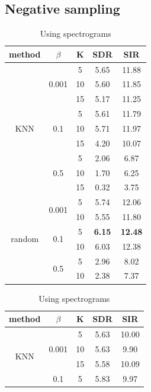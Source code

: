 \documentclass[master, tikz, final,11pt, dvipdfmx]{iscs-thesis}
\begin{document}
\subsection{Negative sampling}
\label{NS}

\begin{table}
\begin{subtable}{.5\linewidth}
\centering
\begin{tabular}{c|c|c|c|c}
method & $\beta$ & K & SDR & SIR \\ 
\hline
\multirow{9}{*}{KNN}  & \multirow{3}{*}{0.001} & 5 & 5.65 & 11.88 \\ 
\cline{3-5}
 &  & 10 & 5.60 & 11.85 \\
\cline{3-5}
 &  & 15 & 5.17 & 11.25 \\
\cline{2-5}
 & \multirow{3}{*}{0.1} & 5 & 5.61 & 11.79 \\
\cline{3-5}
 &  & 10 & 5.71 & 11.97 \\
\cline{3-5}
 &  & 15 & 4.20 & 10.07 \\
\cline{2-5}
 & \multirow{3}{*}{0.5} & 5 & 2.06 & 6.87 \\
\cline{3-5}
 &  & 10 & 1.70 & 6.25 \\
\cline{3-5}
 &  & 15 & 0.32 & 3.75 \\
\hline
\multirow{9}{*}{random}  & \multirow{2}{*}{0.001} & 5 & 5.74 & 12.06 \\ 
\cline{3-5}
 &  & 10 & 5.55 & 11.80 \\
\cline{2-5}
 & \multirow{2}{*}{0.1} & 5 & \textbf{6.15} & \textbf{12.48} \\
\cline{3-5}
 &  & 10 & 6.03 & 12.38 \\
\cline{2-5}
 & \multirow{2}{*}{0.5} & 5 & 2.96 & 8.02 \\
\cline{3-5}
 &  & 10 & 2.38 & 7.37 \\
\hline
\end{tabular}
\caption{Using spectrograms}
\label{table:SCE100NS}
\end{subtable}%
\begin{subtable}{.5\linewidth}
\centering
\begin{tabular}{c|c|c|c|c}
method & $\beta$ & K & SDR & SIR \\ 
\hline
\multirow{9}{*}{KNN}  & \multirow{3}{*}{0.001} & 5 & 5.63 & 10.00 \\ 
\cline{3-5}
 &  & 10 & 5.63 & 9.90 \\
\cline{3-5}
 &  & 15 & 5.58 & 10.09 \\
\cline{2-5}
 & \multirow{3}{*}{0.1} & 5 & 5.83 & 9.97 \\

\end{tabular}
\end{subtable}
\end{table}
\end{document}

